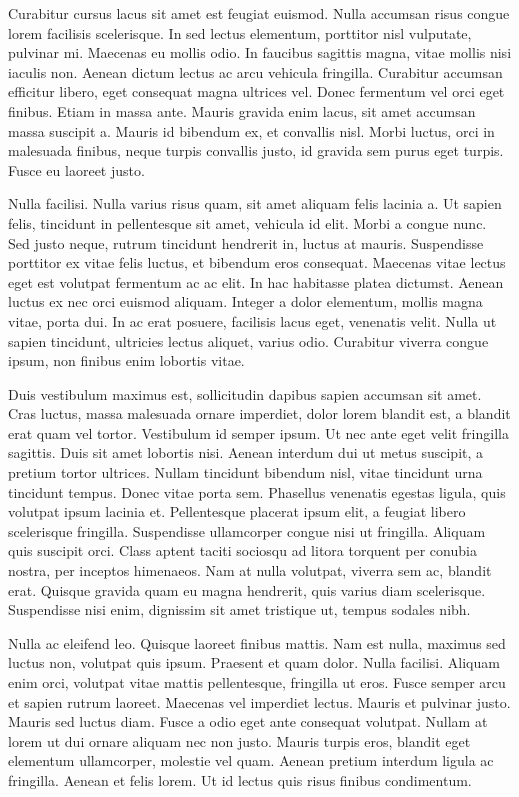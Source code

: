 Curabitur cursus lacus sit amet est feugiat euismod. Nulla accumsan risus congue lorem facilisis scelerisque. In sed lectus elementum, porttitor nisl vulputate, pulvinar mi. Maecenas eu mollis odio. In faucibus sagittis magna, vitae mollis nisi iaculis non. Aenean dictum lectus ac arcu vehicula fringilla. Curabitur accumsan efficitur libero, eget consequat magna ultrices vel. Donec fermentum vel orci eget finibus. Etiam in massa ante. Mauris gravida enim lacus, sit amet accumsan massa suscipit a. Mauris id bibendum ex, et convallis nisl. Morbi luctus, orci in malesuada finibus, neque turpis convallis justo, id gravida sem purus eget turpis. Fusce eu laoreet justo.

Nulla facilisi. Nulla varius risus quam, sit amet aliquam felis lacinia a. Ut sapien felis, tincidunt in pellentesque sit amet, vehicula id elit. Morbi a congue nunc. Sed justo neque, rutrum tincidunt hendrerit in, luctus at mauris. Suspendisse porttitor ex vitae felis luctus, et bibendum eros consequat. Maecenas vitae lectus eget est volutpat fermentum ac ac elit. In hac habitasse platea dictumst. Aenean luctus ex nec orci euismod aliquam. Integer a dolor elementum, mollis magna vitae, porta dui. In ac erat posuere, facilisis lacus eget, venenatis velit. Nulla ut sapien tincidunt, ultricies lectus aliquet, varius odio. Curabitur viverra congue ipsum, non finibus enim lobortis vitae.

Duis vestibulum maximus est, sollicitudin dapibus sapien accumsan sit amet. Cras luctus, massa malesuada ornare imperdiet, dolor lorem blandit est, a blandit erat quam vel tortor. Vestibulum id semper ipsum. Ut nec ante eget velit fringilla sagittis. Duis sit amet lobortis nisi. Aenean interdum dui ut metus suscipit, a pretium tortor ultrices. Nullam tincidunt bibendum nisl, vitae tincidunt urna tincidunt tempus. Donec vitae porta sem. Phasellus venenatis egestas ligula, quis volutpat ipsum lacinia et. Pellentesque placerat ipsum elit, a feugiat libero scelerisque fringilla. Suspendisse ullamcorper congue nisi ut fringilla. Aliquam quis suscipit orci. Class aptent taciti sociosqu ad litora torquent per conubia nostra, per inceptos himenaeos. Nam at nulla volutpat, viverra sem ac, blandit erat. Quisque gravida quam eu magna hendrerit, quis varius diam scelerisque. Suspendisse nisi enim, dignissim sit amet tristique ut, tempus sodales nibh.

Nulla ac eleifend leo. Quisque laoreet finibus mattis. Nam est nulla, maximus sed luctus non, volutpat quis ipsum. Praesent et quam dolor. Nulla facilisi. Aliquam enim orci, volutpat vitae mattis pellentesque, fringilla ut eros. Fusce semper arcu et sapien rutrum laoreet. Maecenas vel imperdiet lectus. Mauris et pulvinar justo. Mauris sed luctus diam. Fusce a odio eget ante consequat volutpat. Nullam at lorem ut dui ornare aliquam nec non justo. Mauris turpis eros, blandit eget elementum ullamcorper, molestie vel quam. Aenean pretium interdum ligula ac fringilla. Aenean et felis lorem. Ut id lectus quis risus finibus condimentum.

